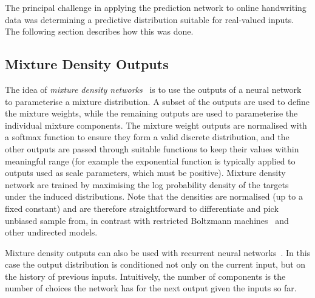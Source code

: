\documentclass{article}
\begin{document}
The principal challenge in applying the prediction network to online handwriting data was determining a predictive distribution suitable for real-valued inputs.
The following section describes how this was done.

\subsection{Mixture Density Outputs}
The idea of \emph{mixture density networks}~\cite{bishop94mixture,bishop95book} is to use the outputs of a neural network to parameterise a mixture distribution.
A subset of the outputs are used to define the mixture weights, while the remaining outputs are used to parameterise the individual mixture components.
The mixture weight outputs are normalised with a softmax function to ensure they form a valid discrete distribution, and the other outputs are passed through suitable functions to keep their values within meaningful range (for example the exponential function is typically applied to outputs used as scale parameters, which must be positive).
Mixture density network are trained by maximising the log probability density of the targets under the induced distributions.
Note that the densities are normalised (up to a fixed constant) and are therefore straightforward to differentiate and pick unbiased sample from, in contrast with restricted Boltzmann machines~\cite{hinton10rbm} and other undirected models.

Mixture density outputs can also be used with recurrent neural networks~\cite{schuster99mixture}.
In this case the output distribution is conditioned not only on the current input, but on the history of previous inputs.
Intuitively, the number of components is the number of choices the network has for the next output given the inputs so far.
\end{document}
